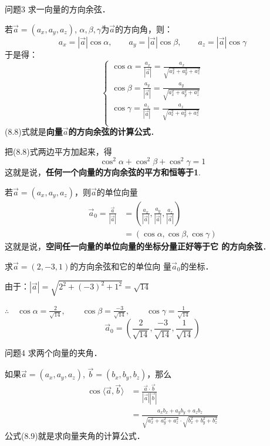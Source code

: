 \begin{blk}
    {问题3} 求一向量的方向余弦．
\end{blk}

若$\vec{a}=(a_x,a_y,a_z)$, $\alpha,\beta,\gamma$为$\vec{a}$的方向角，则：
\[a_x=|\vec{a}|\cos\alpha,\qquad a_y=|\vec{a}|\cos\beta,\qquad a_z=|\vec{a}|\cos\gamma\]
于是得：
\begin{equation}
    \begin{cases}
    \cos\alpha=\frac{a_x}{|\vec{a}|}=\frac{a_x}{\sqrt{a^2_x+a^2_y+a^2_z}}\\
    \cos\beta=\frac{a_y}{|\vec{a}|}=\frac{a_y}{\sqrt{a^2_x+a^2_y+a^2_z}}\\
    \cos\gamma=\frac{a_z}{|\vec{a}|}=\frac{a_z}{\sqrt{a^2_x+a^2_y+a^2_z}}\\        
    \end{cases}
\end{equation}
(8.8)式就是\textbf{向量$\vec{a}$的方向余弦的计算公式}．

把(8.8)式两边平方加起来，得
\[\cos^2\alpha+\cos^2\beta+\cos^2\gamma=1\]
这就是说，\textbf{任何一个向量的方向余弦的平方和恒等于1}.

若$\vec{a}=(a_x,a_y,a_z)$，则$\vec{a}$的单位向量
\[\begin{split}
    \vec{a}_0=\frac{\vec{a}}{|\vec{a}|}&=\left(\frac{a_x}{|\vec{a}|},\frac{a_y}{|\vec{a}|},\frac{a_z}{|\vec{a}|}\right)\\
    &=(\cos\alpha,\cos\beta,\cos\gamma)
\end{split}\]
这就是说，\textbf{空间任一向量的单位向量的坐标分量正好等于它
的方向余弦}．

\begin{example}
    求$\vec{a}=(2,-3,1)$的方向余弦和它的单位向
量$\vec{a}_0$的坐标．
\end{example}

\begin{solution}
由于：$|\vec{a}|=\sqrt{2^2+(-3)^2+1^2}=\sqrt{14}$

$\therefore\quad \cos\alpha=\frac{2}{\sqrt{14}},\qquad \cos\beta=\frac{-3}{\sqrt{14}},\qquad \cos\gamma=\frac{1}{\sqrt{14}}$
\[\vec{a}_0=\left(\frac{2}{\sqrt{14}},\frac{-3}{\sqrt{14}},\frac{1}{\sqrt{14}}\right)\]
\end{solution}

\begin{blk}
    {问题4}
求两个向量的夹角．
\end{blk}

如果$\vec{a}=(a_x,a_y,a_z)$, $\vec{b}=(b_x,b_y,b_z)$，那么
\begin{equation}
    \begin{split}
\cos\langle \vec{a},\vec{b}\rangle &=\frac{\vec{a}\cdot \vec{b}}{|\vec{a}||\vec{b}|}\\
&=\frac{a_xb_x+a_yb_y+a_zb_z}{\sqrt{a^2_x+a^2_y+a^2_z}\cdot \sqrt{b^2_x+b^2_y+b^2_z}}
    \end{split}
\end{equation}
公式(8.9)就是求向量夹角的计算公式．



